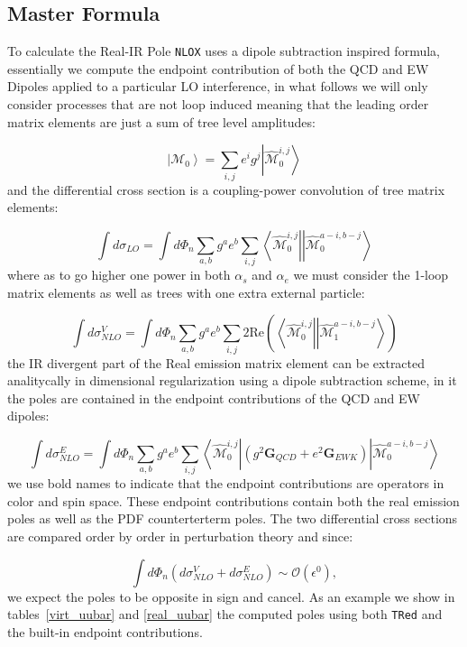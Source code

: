 \documentclass[a4paper]{article}
\def \NLOX{\texttt{NLOX} }
\def \TRed{\texttt{TRed} }
\def \MBra#1#2#3{\left<\hat{\mathcal{M}}_{#1}^{#2,#3}\right|}
\def \MKet#1#2#3{\left|\hat{\mathcal{M}}_{#1}^{#2,#3}\right>}
\begin{document}
\subsection{Master Formula}
To calculate the Real-IR Pole \NLOX uses a dipole subtraction inspired formula, essentially we 
compute the endpoint contribution of both the QCD and EW Dipoles applied to a particular LO 
interference, in what follows we will only consider processes that are not loop induced meaning 
that the leading order matrix elements are just a sum of tree level amplitudes:

\begin{equation}
 \left|\mathcal{M}_{0}\right> = \sum_{i,j}e^i g^j \left|\hat{\mathcal{M}}^{i,j}_{0}\right>
\end{equation}
and the differential cross section is a coupling-power convolution of tree matrix elements:

\begin{equation}
 \int d\sigma_{LO} = \int d\Phi_{n}
 \sum_{a,b} g^{a} e^{b}\sum_{i,j}
 \left<{\hat{\mathcal{M}}}^{i,j}_{0}\right|
 \left|{\hat{\mathcal{M}}}^{a-i,b-j}_{0}\right>
\end{equation}
where as to go higher one power in both $\alpha_s$ and $\alpha_e$ we must consider the 1-loop
matrix elements as well as trees with one extra external particle:

\begin{equation}
 \int d\sigma^V_{NLO} = 
 \int d\Phi_{n}\sum_{a,b}
 g^a e^b 
 \sum_{i,j}
 2\text{Re}\left(
 \MBra{0}{i}{j}
  \MKet{1}{a-i}{b-j}
 \right)
\end{equation}
the IR divergent part of the Real emission matrix element can be extracted analitycally in 
dimensional regularization using a dipole subtraction scheme, in it the poles are contained 
in the endpoint contributions of the QCD and EW dipoles:

\begin{equation}
 \int d\sigma^E_{NLO} = \int d\Phi_{n}
 \sum_{a,b} g^{a} e^{b} 
 \sum_{i,j}
 \MBra{0}{i}{j}
 \left(
 g^2\textbf{G}_{QCD}
 +
 e^2\textbf{G}_{EWK}
 \right)
 \MKet{0}{a-i}{b-j}
\end{equation}
we use bold names to indicate that the endpoint contributions are operators in color and spin space. 
These endpoint contributions contain both the real emission poles as well as the PDF counterterterm poles.
The two differential cross sections are compared order by order in perturbation theory and since:

\begin{equation}
 \int d\Phi_n \left(d\sigma_{NLO}^V + d\sigma_{NLO}^E\right) \sim \mathcal{O}(\epsilon^0),
 \label{cancellation}
\end{equation}
we expect the poles to be opposite in sign and cancel. As an example we show in tables~\ref{virt_uubar} and  \ref{real_uubar} the computed poles using both \TRed and the built-in endpoint contributions. 
\end{document}

